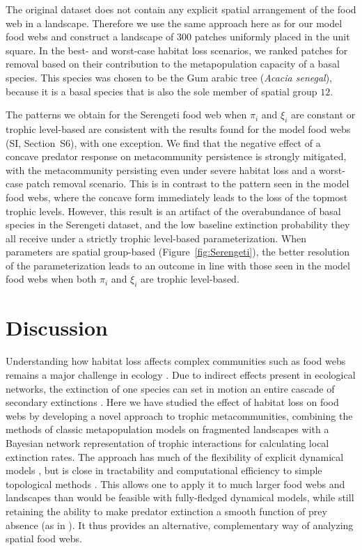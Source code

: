 \documentclass[11pt]{article}
\newcommand{\SI}{SI}
\begin{document}
The original dataset does not contain any explicit spatial arrangement of the food web in a landscape. Therefore we use the same approach here as for our model food webs and construct a landscape of $300$ patches uniformly placed in the unit square. In the best- and worst-case habitat loss scenarios, we ranked patches for removal based on their contribution to the metapopulation capacity of a basal species. This species was chosen to be the Gum arabic tree (\textit{Acacia senegal}), because it is a basal species that is also the sole member of spatial group $12$.

The patterns we obtain for the Serengeti food web when $\pi_i$ and $\xi_i$ are constant or trophic level-based are consistent with the results found for the model food webs (\SI, Section~S6), with one exception. We find that the negative effect of a concave predator response on metacommunity persistence is strongly mitigated, with the metacommunity persisting even under severe habitat loss and a worst-case patch removal scenario. This is in contrast to the pattern seen in the model food webs, where the concave form immediately leads to the loss of the topmost trophic levels. However, this result is an artifact of the overabundance of basal species in the Serengeti dataset, and the low baseline extinction probability they all receive under a strictly trophic level-based parameterization. When parameters are spatial group-based (Figure~\ref{fig:Serengeti}), the better resolution of the parameterization leads to an outcome in line with those seen in the model food webs when both $\pi_i$ and $\xi_i$ are trophic level-based.


\section{Discussion} \label{sec:discussion}

Understanding how habitat loss affects complex communities such as food webs remains a major challenge in ecology \citep{Guzman2018, LeiboldChase2018}. Due to indirect effects present in ecological networks, the extinction of one species can set in motion an entire cascade of secondary extinctions \citep{EbenmanJonsson2005, Dunne2009}. Here we have studied the effect of habitat loss on food webs by developing a novel approach to trophic metacommunities, combining the methods of classic metapopulation models on fragmented landscapes \citep{HanskiOvaskainen2000, HanskiOvaskainen2003, OvaskainenHanski2001, Grillietal2015} with a Bayesian network representation of trophic interactions \citep{Eklofetal2013MEE} for calculating local extinction rates. The approach has much of the flexibility of explicit dynamical models \citep{Ryser2019}, but is close in tractability and computational efficiency to simple topological methods \citep{Dunne2009}. This allows one to apply it to much larger food webs and landscapes than would be feasible with fully-fledged dynamical models, while still retaining the ability to make predator extinction a smooth function of prey absence (as in \citealp{Cazellesetal2015}). It thus provides an alternative, complementary way of analyzing spatial food webs.
\end{document}
